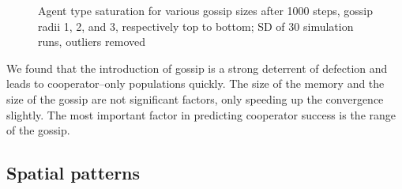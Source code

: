 \documentclass[english]{article}
\begin{document}
\begin{figure}[!h]
  \centering
  \caption{Agent type saturation for various gossip sizes after 1000 steps, gossip radii 1, 2, and 3, respectively top to bottom; SD of 30 simulation runs, outliers removed}
  \label{fig:agent_sat/gossip_size_step1000}
\end{figure}

We found that the introduction of gossip is a strong deterrent of defection and leads to cooperator--only populations quickly.
The size of the memory and the size of the gossip are not significant factors, only speeding up the convergence slightly.
The most important factor in predicting cooperator success is the range of the gossip.


\subsection{Spatial patterns}
\end{document}
